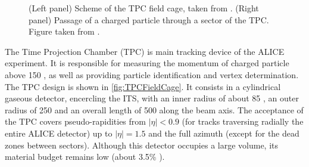 \begin{figure}[t]
	\caption{(Left panel) Scheme of the TPC field cage, taken from \cite{almeALICETPCLarge2010}. (Right panel) Passage of a charged particle through a sector of the TPC. Figure taken from \cite{maireALICETPCSectors2011}.}
	\label{fig:TPCDetector}
\end{figure}

The Time Projection Chamber (TPC) is main tracking device of the ALICE experiment. It is responsible for measuring the momentum of charged particle above 150 \mmom, as well as providing particle identification and vertex determination. The TPC design is shown in \fig\ref{fig:TPCFieldCage}. It consists in a cylindrical gaseous detector, encercling the ITS, with an inner radius of about 85 \cm, an outer radius of 250 \cm and an overall length of 500 \cm along the beam axis. The acceptance of the TPC covers pseudo-rapidities from $|\eta| < 0.9$ (for tracks traversing radially the entire ALICE detector) up to $|\eta| = 1.5$ and the full azimuth (except for the dead zones between sectors). Although this detector occupies a large volume, its material budget remains low (about 3.5\% \Xzero).

